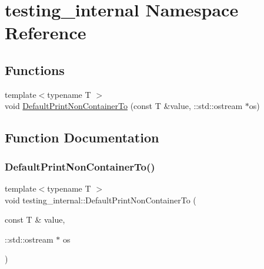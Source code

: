 \hypertarget{namespacetesting__internal}{}\section{testing\+\_\+internal Namespace Reference}
\label{namespacetesting__internal}
\subsection*{Functions}
\begin{DoxyCompactItemize}
\item 
{\footnotesize template$<$typename T $>$ }\\void \mbox{\hyperlink{namespacetesting__internal_a3f49d3d0c996242f9d383c850097a656}{Default\+Print\+Non\+Container\+To}} (const T \&value, \+::std\+::ostream $\ast$os)
\end{DoxyCompactItemize}


\subsection{Function Documentation}
\mbox{\label{namespacetesting__internal_a3f49d3d0c996242f9d383c850097a656}} 
\subsubsection{\texorpdfstring{DefaultPrintNonContainerTo()}{DefaultPrintNonContainerTo()}}
{\footnotesize\ttfamily template$<$typename T $>$ \\
void testing\+\_\+internal\+::\+Default\+Print\+Non\+Container\+To (\begin{DoxyParamCaption}\item[{const T \&}]{value,  }\item[{\+::std\+::ostream $\ast$}]{os }\end{DoxyParamCaption})}

